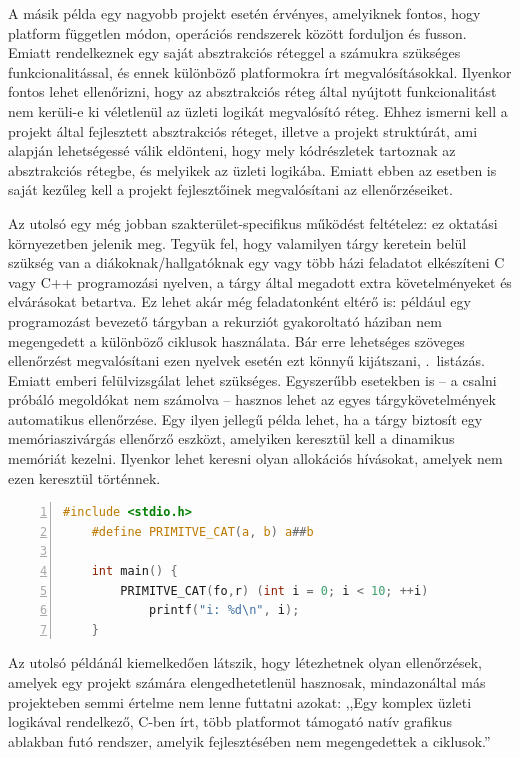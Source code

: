 A másik példa egy nagyobb projekt esetén érvényes, amelyiknek fontos, hogy platform független módon, operációs rendszerek között forduljon és fusson.
Emiatt rendelkeznek egy saját absztrakciós réteggel a számukra szükséges funkcionalitással, és ennek különböző platformokra írt megvalósításokkal.
Ilyenkor fontos lehet ellenőrizni, hogy az absztrakciós réteg által nyújtott funkcionalitást nem kerüli-e ki véletlenül az üzleti logikát megvalósító réteg.
Ehhez ismerni kell a projekt által fejlesztett absztrakciós réteget, illetve a projekt struktúrát, ami alapján lehetségessé válik eldönteni, hogy mely kódrészletek tartoznak az absztrakciós rétegbe, és melyikek az üzleti logikába.
Emiatt ebben az esetben is saját kezűleg kell a projekt fejlesztőinek megvalósítani az ellenőrzéseiket.

Az utolsó egy még jobban szakterület-specifikus működést feltételez: ez oktatási környezetben jelenik meg.
Tegyük fel, hogy valamilyen tárgy keretein belül szükség van a diákoknak/hallgatóknak egy vagy több házi feladatot elkészíteni C vagy C++ programozási nyelven, a tárgy által megadott extra követelményeket és elvárásokat betartva.
Ez lehet akár még feladatonként eltérő is: például egy programozást bevezető tárgyban a rekurziót gyakoroltató háziban nem megengedett a különböző ciklusok használata.
Bár erre lehetséges szöveges ellenőrzést megvalósítani ezen nyelvek esetén ezt könnyű kijátszani, \ld {}.~listázás.
Emiatt emberi felülvizsgálat lehet szükséges.
Egyszerűbb esetekben is -- a csalni próbáló megoldókat nem számolva -- hasznos lehet az egyes tárgykövetelmények automatikus ellenőrzése.
Egy ilyen jellegű példa lehet, ha a tárgy biztosít egy memóriaszivárgás ellenőrző eszközt, amelyiken keresztül kell a dinamikus memóriát kezelni. Ilyenkor lehet keresni olyan allokációs hívásokat, amelyek nem ezen keresztül történnek.

\begin{lstlisting}[gobble=2,numbers=left,label=lst:cpp-tricks,caption={Szöveges ellenőrzést kijátszó ,,for'' ciklus},language=c]
	#include <stdio.h>
	#define PRIMITVE_CAT(a, b) a##b
	
	int main() {
		PRIMITVE_CAT(fo,r) (int i = 0; i < 10; ++i)
		    printf("i: %d\n", i);
	}
\end{lstlisting}

Az utolsó példánál kiemelkedően látszik, hogy létezhetnek olyan ellenőrzések, amelyek egy projekt számára elengedhetetlenül hasznosak, mindazonáltal más projekteben semmi értelme nem lenne futtatni azokat: ,,Egy komplex üzleti logikával rendelkező, C-ben írt, több platformot támogató natív grafikus ablakban futó rendszer, amelyik fejlesztésében nem megengedettek a ciklusok.''

